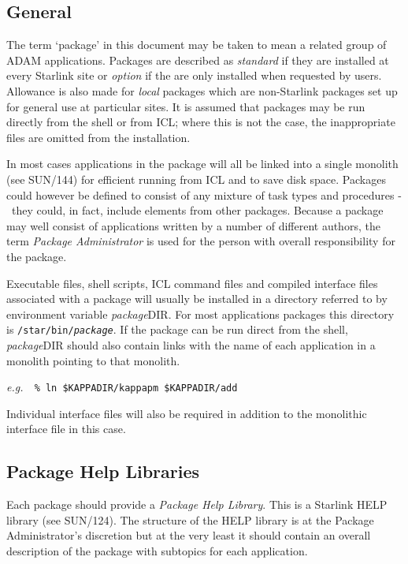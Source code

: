 \documentclass[twoside,11pt]{article}
\newcommand{\xref}[3]{#1}
\newcommand{\xlabel}[1]{}
\renewcommand{\_}{\texttt{\symbol{95}}}
\newcommand{\dash}{--}
\renewcommand{\dash}{-}
\begin{document}
\subsection{\xlabel{general}General}
\label{pack_gen}
The term `package' in this document may be taken to mean a related group of 
ADAM applications. Packages are described as \textit{standard} if they are
installed at every Starlink site or \textit{option} if the are only installed
when requested by users.
Allowance is also
made for \textit{local}\/ packages which are non-Starlink packages set up for 
general use at particular sites.
It is assumed that packages may be run directly from the shell or from ICL;
where this is not the case, the inappropriate files are omitted from the
installation.

In most cases applications in the package will all be linked into a single 
monolith (see 
\xref{SUN/144}{sun144}{monoliths}) for efficient running from ICL and to save
disk space.
Packages could however be defined to consist of any mixture of task types 
and procedures \dash\ they could, in fact, include elements from other packages.
Because a package may well consist of applications written by a number of
different authors, the term \textit{Package Administrator} is used for the
person with overall responsibility for the package.

Executable files, shell scripts, ICL command files and compiled 
\xref{interface files}{sun115}{} 
associated with a package will usually be installed in a directory referred to
by environment variable \textit{package}\_DIR.
For most applications packages this directory is 
\texttt{/star/bin/\textit{package}}.
If the package can be run direct from the shell, \textit{package}\_DIR should
also contain links with the name of each application in a monolith pointing
to that monolith.

\textit{e.g.}\ \texttt{ \% ln \$KAPPA\_DIR/kappa\_pm \$KAPPA\_DIR/add }

Individual interface files will also be required in addition to the monolithic 
interface file in this case.

\subsection{\xlabel{package_help_libraries}Package Help Libraries}
Each package should provide a \textit{Package Help Library}.
This is a Starlink HELP library (see 
\xref{SUN/124}{sun124}{}).
The structure of the HELP library is at the Package Administrator's discretion
but at the very least it should contain an overall description of the package
with subtopics for each application.
\end{document}
